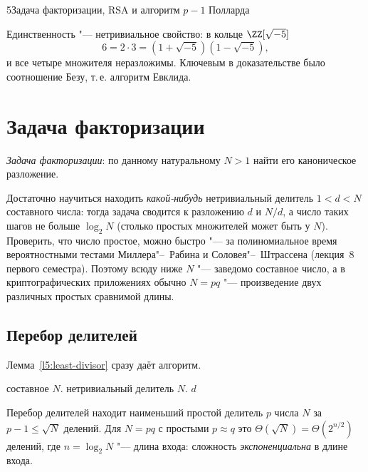 \begin{lecture}{5}{Задача факторизации, RSA и алгоритм \texorpdfstring{$p - 1$}{p - 1} Полларда}
\begin{remark}
Единственность "--- нетривиальное свойство: в кольце $\ZZ[\sqrt{-5}]$
\[
  6 = 2 \cdot 3 = (1 + \sqrt{-5})(1 - \sqrt{-5}),
\]
и все четыре множителя неразложимы. Ключевым в доказательстве было соотношение Безу, т.\,е.
алгоритм Евклида.
\end{remark}


\section{Задача факторизации}

\begin{definition}
\emph{Задача факторизации}: по данному натуральному $N > 1$ найти его каноническое разложение.
\end{definition}

Достаточно научиться находить \emph{какой-нибудь} нетривиальный делитель $1 < d < N$
составного числа: тогда задача сводится к разложению $d$ и $N/d$, а число таких шагов не
больше $\log_2 N$ (столько простых множителей может быть у $N$). Проверить, что число
простое, можно быстро "--- за полиномиальное время вероятностными тестами Миллера"--~Рабина и
Соловея"--~Штрассена (лекция~8 первого семестра). Поэтому всюду ниже $N$ "--- заведомо
составное число, а в криптографических приложениях обычно $N = pq$ "--- произведение двух
различных простых сравнимой длины.

\subsection{Перебор делителей}

Лемма~\ref{l5:least-divisor} сразу даёт алгоритм.

\begin{algorithm}\label{l5:trial}
\begin{algorithmic}[1]
\Require составное $N$.
\Ensure нетривиальный делитель $N$.
   \Return $d$ \EndIf
\EndFor
\end{algorithmic}
\end{algorithm}

\begin{proposition}\label{l5:trial-complexity}
Перебор делителей находит наименьший простой делитель $p$ числа $N$ за $p - 1 \le \sqrt N$
делений. Для $N = pq$ с простыми $p \approx q$ это $\Theta(\sqrt N) = \Theta(2^{n/2})$ делений,
где $n = \log_2 N$ "--- длина входа: сложность \emph{экспоненциальна} в длине входа.
\end{proposition}


\end{lecture}
